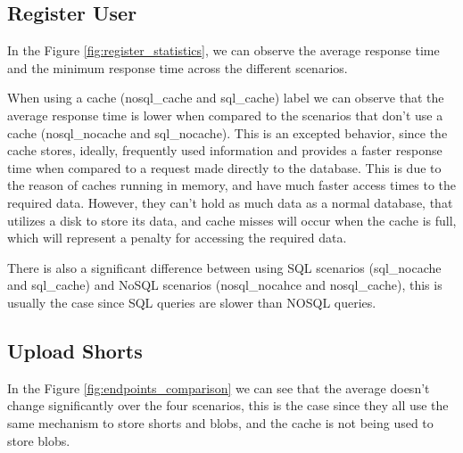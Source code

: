 \documentclass[10pt,a4paper,twocolumn]{article}
\begin{document}
\subsection{Register User}
\label{sec:RegisterUser}
In the Figure \ref{fig:register_statistics}, we can observe the average response time and the minimum response time across the different scenarios. 
\par When using a cache (nosql\_cache and sql\_cache) label we can observe that the average response time is lower when compared to the scenarios that don't use a cache (nosql\_nocache and sql\_nocache). This is an excepted behavior, since the cache stores, ideally, frequently used information and provides a faster response time when compared to a request made directly to the database. This is due to the reason of caches running in memory, and have much faster access times to the required data. However, they can't hold as much data as a normal database, that utilizes a disk to store its data, and cache misses will occur when the cache is full, which will represent a penalty for accessing the required data.
\par There is also a significant difference between using SQL scenarios (sql\_nocache and sql\_cache) and NoSQL scenarios (nosql\_nocahce and nosql\_cache), this is usually the case since SQL queries are slower than NOSQL queries\cite{sqlNOSQLPerformance}.

\subsection{Upload Shorts}
\label{sec:UploadShorts}
In the Figure \ref{fig:endpoints_comparison} we can see that the average doesn't change significantly over the four scenarios, this is the case since they all use the same mechanism to store shorts and blobs, and the cache is not being used to store blobs.

\end{document}
